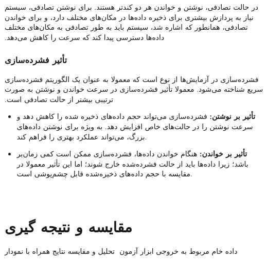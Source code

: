‫در حالت تصادفی، نوشتن و خواندن هر دو کندتر هستند. برای نوشتن تصادفی، سیستم نیاز به پردازش بیشتری برای ذخیره داده‌ها در مکان‌های مختلف دارد، و برای خواندن تصادفی، همانطور که اشاره شد، سیستم باید به طور تصادفی به مکان‌های مختلف داده‌ها دسترسی پیدا کند که سرعت را کاهش می‌دهد.
‫
‫\subsubsection*{تأثیر فشرده‌سازی}
‫فشرده‌سازی در آزمایش‌ها از نوع  است که معمولا به عنوان یک الگوریتم فشرده‌سازی سریع شناخته می‌شود. معمولا تأثیر فشرده‌سازی در سرعت خواندن و نوشتن به صورت ترتیبی بیشتر از حالت تصادفی است.
‫\begin{itemize}
‫    \item \textbf{تأثیر بر نوشتن:} فشرده‌سازی می‌تواند حجم داده‌های ذخیره شده را کاهش دهد و سرعت نوشتن را در حالت‌های خاص افزایش دهد. به ویژه برای نوشتن داده‌های بزرگ، می‌تواند عملکرد بهتری را فراهم کند.
‫    \item \textbf{تأثیر بر خواندن:} هنگام خواندن داده‌ها، فشرده‌سازی ممکن است کمی زمان‌بر باشد؛ زیرا داده‌ها باید از حالت فشرده‌شده خارج شوند؛ اما این تأثیر معمولا در مقایسه با حجم داده‌های ذخیره‌شده قابل چشم‌پوشی است.
‫\end{itemize}
‫\section{مقایسه و نتیجه گیری}
‫
‫داده خام مربوط به خروجی ابزار آزمون
‫
‫تحلیل و مقایسه نتایج همراه با نمودار
‫
‫
‫
‫
‫